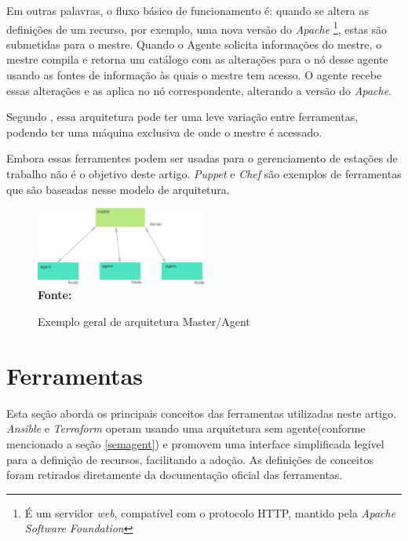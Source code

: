  Em outras palavras, o fluxo básico de funcionamento é: quando se altera as definições de um recurso, por exemplo, uma nova versão do \textit{Apache} \footnote{É um servidor \textit{web}, compatível com o protocolo HTTP, mantido pela \textit{Apache Software Foundation }}, estas são submetidas para o mestre. Quando o Agente solicita informações do mestre, o mestre compila e retorna um catálogo com as alterações para o nó desse agente usando as fontes de informação às quais o mestre tem acesso. O agente recebe essas alterações e as aplica no nó correspondente, alterando a versão do \textit{Apache}.   

Segundo \cite{Morris:2016:ICM:3006361}, essa arquitetura pode ter uma leve variação entre ferramentas, podendo ter uma máquina exclusiva de onde o mestre é acessado.

Embora essas ferramentes podem ser usadas para o gerenciamento de estações de trabalho não é o objetivo deste artigo. 
\textit{Puppet} e \textit{Chef} são exemplos de ferramentas que são baseadas nesse modelo de arquitetura. 


 \begin{figure}[ht]
	\centering	
	\caption[\hspace{0.1cm}Exemplo arquitetura Master/Agent]{Exemplo geral de arquitetura Master/Agent}
	\vspace{-0.4cm}
	\includegraphics[width=0.5\textwidth]{figuras/master-agent.png}
	 \vspace{-0.2cm}
	\\\textbf{\footnotesize Fonte: \cite{Harit}}
	\label{fig:figura4}
\end{figure}
\vspace{-0.5cm}

\section{Ferramentas}

Esta seção aborda os principais conceitos das ferramentas utilizadas neste artigo. \textit{Ansible} e \textit{Terraform} operam usando uma arquitetura sem agente(conforme mencionado a seção \ref{semagent}) e promovem uma interface simplificada legível para a definição de recursos, facilitando a adoção. As definições de conceitos foram retirados diretamente da documentação oficial das ferramentas.

